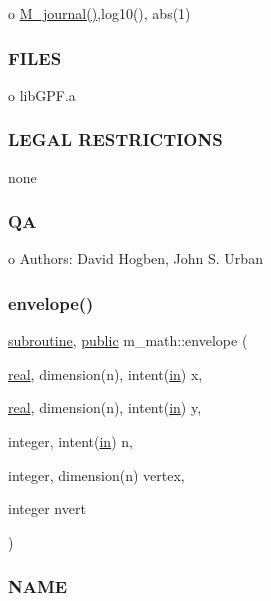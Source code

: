 o \hyperlink{M__journal_83_8txt_aba3a4e3e5bac44e7e807c3472bb2af91}{M\+\_\+journal()},log10(), abs(1)

\subsubsection*{F\+I\+L\+ES}

o lib\+G\+P\+F.\+a \subsubsection*{L\+E\+G\+AL R\+E\+S\+T\+R\+I\+C\+T\+I\+O\+NS}

none \subsubsection*{QA}

o Authors\+: David Hogben, John S. Urban \mbox{\label{namespacem__math_aec13601dba0398f78ad7b25d964f40a6}} 
\subsubsection{\texorpdfstring{envelope()}{envelope()}}
{\footnotesize\ttfamily \hyperlink{M__stopwatch_83_8txt_acfbcff50169d691ff02d4a123ed70482}{subroutine}, \hyperlink{M__stopwatch_83_8txt_a2f74811300c361e53b430611a7d1769f}{public} m\+\_\+math\+::envelope (\begin{DoxyParamCaption}\item[{\hyperlink{read__watch_83_8txt_abdb62bde002f38ef75f810d3a905a823}{real}, dimension(n), intent(\hyperlink{M__journal_83_8txt_afce72651d1eed785a2132bee863b2f38}{in})}]{x,  }\item[{\hyperlink{read__watch_83_8txt_abdb62bde002f38ef75f810d3a905a823}{real}, dimension(n), intent(\hyperlink{M__journal_83_8txt_afce72651d1eed785a2132bee863b2f38}{in})}]{y,  }\item[{integer, intent(\hyperlink{M__journal_83_8txt_afce72651d1eed785a2132bee863b2f38}{in})}]{n,  }\item[{integer, dimension(n)}]{vertex,  }\item[{integer}]{nvert }\end{DoxyParamCaption})}



\subsubsection*{N\+A\+ME}

